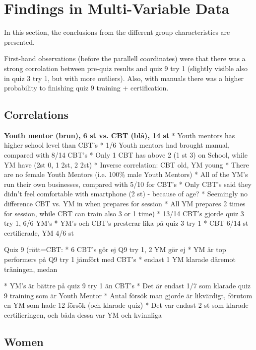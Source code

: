 \section{Findings in Multi-Variable Data}



In this section, the conclusions from the different group characteristics are presented.

First-hand observations (before the parallell coordinates) were that there was a strong corrolation between pre-quiz results and quiz 9 try 1 (slightly visible also in quiz 3 try 1, but with more outliers). Also, with manuals there was a higher probability to finishing quiz 9 training + certification.

\subsection{Correlations}

\textbf{Youth mentor (brun), 6 st vs. CBT (blå), 14 st}
* Youth mentors has higher school level than CBT's
* 1/6 Youth mentors had brought manual, compared with 8/14 CBT's
* Only 1 CBT has above 2 (1 st 3) on School, while YM have (2st 0, 1 2st, 2 2st)
* Inverse correlation: CBT old, YM young
* There are no female Youth Mentors (i.e. 100\% male Youth Mentors)
* All of the YM's run their own businesses, compared with 5/10 for CBT's
* Only CBT's said they didn't feel comfortable with smartphone (2 st) - because of age?
* Seemingly no difference CBT vs. YM in when prepares for session
* All YM prepares 2 times for session, while CBT can train also 3 or 1 time)
* 13/14 CBT's gjorde quiz 3 try 1, 6/6 YM's
* YM's och CBT's presterar lika på quiz 3 try 1
* CBT 6/14 st certifierade, YM 4/6 st

Quiz 9 (rött=CBT:
* 6 CBT's gör ej Q9 try 1, 2 YM gör ej
* YM är top performers på Q9 try 1 jämfört med CBT's
* endast 1 YM klarade däremot träningen, medan

* YM's är bättre på quiz 9 try 1 än CBT's
* Det är endast 1/7 som klarade quiz 9 training som är Youth Mentor
* Antal försök man gjorde är likvärdigt, förutom en YM som hade 12 försök (och klarade quiz)
* Det var endast 2 st som klarade certifieringen, och båda dessa var YM och kvinnliga

\subsection{Women}

